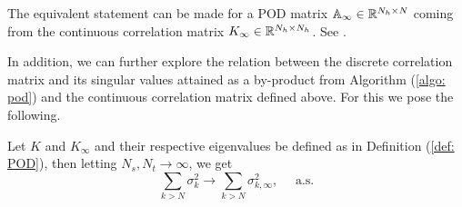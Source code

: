 \begin{remark} \label{remark: continuous correlation existence}
    The equivalent statement can be made for a POD matrix $\mathbb{A}_\infty \in \mathbb{R}^{N_h \times N}$ coming from 
    the continuous correlation matrix $K_\infty \in \mathbb{R}^{N_h \times N_h}$. See \cite{kunischvolkwein2001}.
\end{remark}


In addition, we can further explore the relation between the discrete correlation matrix and
its singular values attained as a by-product from Algorithm (\ref{algo: pod}) and the continuous 
correlation matrix defined above. For this we pose the following.

\begin{proposition} \label{prop: existence and convergence to sigma infty}
    Let $K$ and $K_\infty$ and their respective eigenvalues be defined as in Definition (\ref{def: POD}), 
    then letting $N_s, N_t \to \infty$, we get 
    \begin{equation*}
        \sum_{k > N} \sigma_k^2 \longrightarrow \sum_{k > N} \sigma_{k, \infty}^2, \quad \mbox{ a.s.}
    \end{equation*}
\end{proposition}
